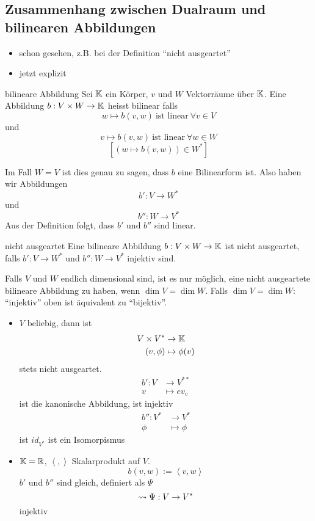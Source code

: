 \subsection{Zusammenhang zwischen Dualraum und bilinearen Abbildungen}
\begin{itemize}
  \item schon gesehen, z.B. bei der Definition ``nicht ausgeartet''
  \item jetzt explizit
\end{itemize}
\begin{Def}{bilineare Abbildung}
  Sei $\mathbb{K}$ ein Körper, $v$ und $W$ Vektorräume über $\mathbb{K}$. Eine Abbildung $b:V\times W\to \mathbb{K}$ heisst bilinear falls 
  \[w\mapsto b(v,w)\ \text{ist linear}\  \forall v\in V\]
  und
  \[v\mapsto b(v,w)\ \text{ist linear}\  \forall w\in W\]
  \[\left[ (w\mapsto b(v,w))\in W^* \right]\]
\end{Def}
\begin{Bem}
  Im Fall $W=V$ ist dies genau zu sagen, dass $b$ eine Bilinearform ist. Also haben wir Abbildungen
  \[b':V\to W^*\]
  und
  \[b'':W\to V^*\]
  Aus der Definition folgt, dass $b'$ und $b''$ sind linear.
\end{Bem}
\begin{Def}{nicht ausgeartet}
  Eine bilineare Abbildung $b:V\times W\to\mathbb{K}$ ist nicht ausgeartet, falls $b':V\to W^*$ und $b'':W\to V^*$ injektiv sind.
\end{Def}
\begin{Bem}
  Falls $V$ und $W$ endlich dimensional sind, ist es nur möglich, eine nicht ausgeartete bilineare Abbildung zu haben, wenn $\dim V=\dim W$. Falls $\dim V=\dim W:$ ``injektiv'' oben ist äquivalent zu ``bijektiv''.
\end{Bem}
\begin{Bsp}
  \begin{itemize}
    \item $V$ beliebig, dann ist
      \begin{align*}
        V\times V^*&\to\mathbb{K}\\
        (v,\phi)&\mapsto \phi(v)
      \end{align*}
      stets nicht ausgeartet.
      \begin{align*}
        b':V&\to V^{**}\\
        v&\mapsto e v_v
      \end{align*}
      ist die kanonische Abbildung, ist injektiv
      \begin{align*}
        b'':V^*&\to V^*\\
        \phi&\mapsto\phi
      \end{align*}
      ist $id_{V^*}$ ist ein Isomorpismus
    \item $\mathbb{K}=\mathbb{R}$, $\left\langle , \right\rangle $ Skalarprodukt auf $V$.
      \[b(v,w):=\left\langle v,w \right\rangle\]
      $b'$ und $b''$ sind gleich, definiert als $\Psi$
      \[\rightsquigarrow \Psi:V\to V^*\]
      injektiv\\
  \end{itemize}
\end{Bsp}
